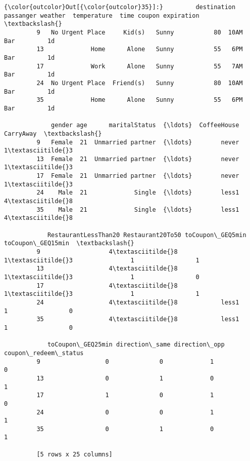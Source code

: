 \documentclass[11pt]{article}
\begin{document}
\begin{Verbatim}[commandchars=\\\{\}]
{\color{outcolor}Out[{\color{outcolor}35}]:}         destination  passanger weather  temperature  time coupon expiration  \textbackslash{}
         9   No Urgent Place     Kid(s)   Sunny           80  10AM    Bar         1d   
         13             Home      Alone   Sunny           55   6PM    Bar         1d   
         17             Work      Alone   Sunny           55   7AM    Bar         1d   
         24  No Urgent Place  Friend(s)   Sunny           80  10AM    Bar         1d   
         35             Home      Alone   Sunny           55   6PM    Bar         1d   
         
             gender age      maritalStatus  {\ldots}  CoffeeHouse CarryAway  \textbackslash{}
         9   Female  21  Unmarried partner  {\ldots}        never       1\textasciitilde{}3   
         13  Female  21  Unmarried partner  {\ldots}        never       1\textasciitilde{}3   
         17  Female  21  Unmarried partner  {\ldots}        never       1\textasciitilde{}3   
         24    Male  21             Single  {\ldots}        less1       4\textasciitilde{}8   
         35    Male  21             Single  {\ldots}        less1       4\textasciitilde{}8   
         
            RestaurantLessThan20 Restaurant20To50 toCoupon\_GEQ5min toCoupon\_GEQ15min  \textbackslash{}
         9                   4\textasciitilde{}8              1\textasciitilde{}3                1                 1   
         13                  4\textasciitilde{}8              1\textasciitilde{}3                1                 0   
         17                  4\textasciitilde{}8              1\textasciitilde{}3                1                 1   
         24                  4\textasciitilde{}8            less1                1                 0   
         35                  4\textasciitilde{}8            less1                1                 0   
         
            toCoupon\_GEQ25min direction\_same direction\_opp  coupon\_redeem\_status  
         9                  0              0             1                     0  
         13                 0              1             0                     1  
         17                 1              0             1                     0  
         24                 0              0             1                     1  
         35                 0              1             0                     1  
         
         [5 rows x 25 columns]
\end{Verbatim}
            
\end{document}
